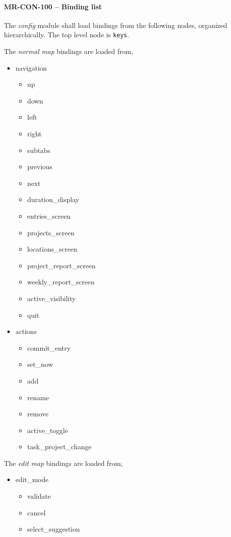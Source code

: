 \paragraph{MR-CON-100 -- Binding list}
The \emph{config} module shall load bindings from the following nodes,
organized hierarchically. The top level node is \lstinline{keys}.

The \emph{normal map} bindings are loaded from,
\begin{itemize}
\item navigation
  \begin{itemize}
  \item up
  \item down
  \item left
  \item right
  \item subtabs
  \item previous
  \item next
  \item duration\_display
  \item entries\_screen
  \item projects\_screen
  \item locations\_screen
  \item project\_report\_screen
  \item weekly\_report\_screen
  \item active\_visibility
  \item quit
  \end{itemize}
\item actions
  \begin{itemize}
  \item commit\_entry
  \item set\_now
  \item add
  \item rename
  \item remove
  \item active\_toggle
  \item task\_project\_change
  \end{itemize}
\end{itemize}

The \emph{edit map} bindings are loaded from,
\begin{itemize}
\item edit\_mode
  \begin{itemize}
  \item validate
  \item cancel
  \item select\_suggestion
  \end{itemize}
\end{itemize}

